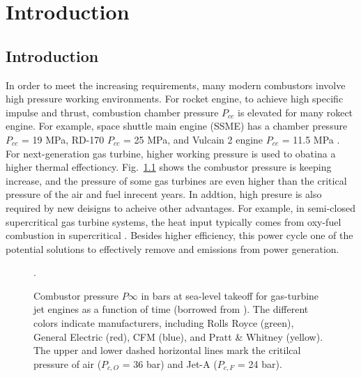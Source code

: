 \chapter{Introduction}
\label{intro_chapter}

\section{Introduction}

In order to meet the increasing requirements, many modern combustors involve high pressure working environments. For rocket engine, to achieve high specific impulse and thrust, combustion chamber pressure $P_{cc}$ is elevated for many rokect engine. For example, space shuttle main engine (SSME) has a chamber pressure $P_{cc}$ = 19 MPa, RD-170 $P_{cc}$ = 25 MPa, and Vulcain 2 engine $P_{cc}$ = 11.5 MPa \cite{arnold2009circumferential}.
For next-generation gas turbine, higher working pressure is used to obatina a higher thermal effectioncy. Fig.~\ref{Intro_gas_turbine} shows the combustor pressure is keeping increase, and the pressure of some gas turbines are even higher than the critical pressure of the air and fuel inrecent years. In addtion, 
high presure is also required by new deisigns to acheive other advantages. For example, in semi-closed supercritical  gas turbine systems, the heat input typically comes from oxy-fuel combustion in supercritical . Besides higher efficiency, this power cycle one of the potential solutions to effectively remove  and  emissions from power generation.


\begin{figure}[htb]
    \centering
    \caption{Combustor pressure $P\infty$ in bars at sea-level takeoff for gas-turbine jet engines as a function of time (borrowed from \cite{jofre2021transcritical}). The different colors indicate manufacturers, including Rolls Royce (green), General Electric (red), CFM (blue), and Pratt \& Whitney (yellow). The upper and lower dashed horizontal lines mark the critilcal pressure of air ($P_{c,O}$ = 36 bar) and Jet-A ($P_{c,F}$ = 24 bar).} \label{Intro_gas_turbine}. 
\end{figure}


